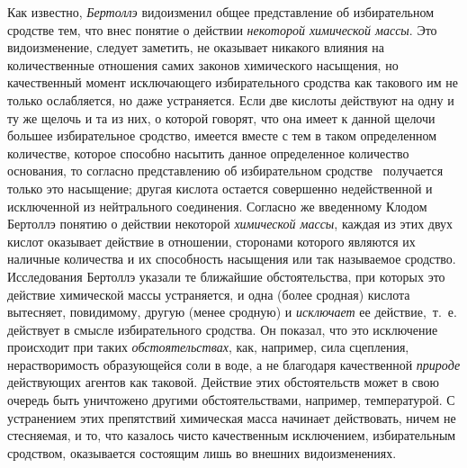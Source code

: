 Как известно, {\em Бертоллэ} видоизменил общее
представление об избирательном сродстве тем, что внес понятие о действии
{\em некоторой химической массы}. Это видоизменение,
следует заметить, не оказывает никакого влияния на количественные отношения
самих законов химического насыщения, но качественный момент исключающего
избирательного сродства как такового им не только ослабляется, но даже
устраняется. Если две кислоты действуют на одну и ту же щелочь и та из них,
о которой говорят, что она имеет к данной щелочи большее избирательное
сродство, имеется вместе с тем в таком определенном количестве, которое
способно насытить данное определенное количество основания, то согласно
представлению об избирательном
сродстве~
получается только это насыщение; другая кислота остается совершенно
недейственной и исключенной из нейтрального соединения. Согласно же
введенному Клодом Бертоллэ понятию о действии некоторой
{\em химической массы}, каждая из этих двух кислот
оказывает действие в отношении, сторонами которого являются их наличные
количества и их способность насыщения или так называемое сродство.
Исследования Бертоллэ указали те ближайшие обстоятельства, при которых это
действие химической массы устраняется, и одна (более сродная) кислота
вытесняет, повидимому, другую (менее сродную) и
{\em исключает} ее действие,~т.~е. действует в смысле
избирательного сродства. Он показал, что это исключение происходит при
таких {\em обстоятельствах}, как, например, сила
сцепления, нерастворимость образующейся соли в воде, а не благодаря
качественной {\em природе} действующих агентов как
таковой. Действие этих обстоятельств может в свою очередь быть уничтожено
другими обстоятельствами, например, температурой. С устранением этих
препятствий химическая масса начинает действовать, ничем не стесняемая,
 и то, что
казалось чисто качественным исключением, избирательным сродством,
оказывается состоящим лишь во внешних видоизменениях.

